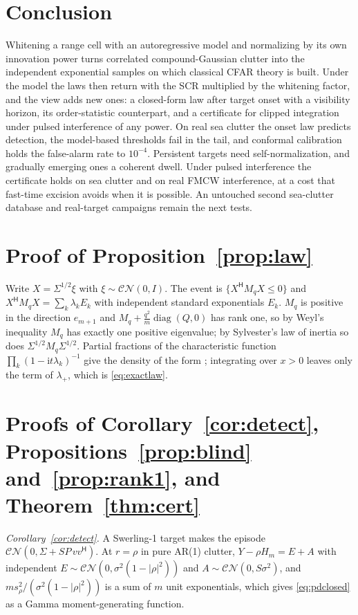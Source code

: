 \documentclass[journal]{IEEEtran}
\begin{document}
\section{Conclusion}
Whitening a range cell with an autoregressive model and normalizing by its own innovation power turns correlated compound-Gaussian clutter into the independent exponential samples on which classical CFAR theory is built. Under the model the laws then return with the SCR multiplied by the whitening factor, and the view adds new ones: a closed-form law after target onset with a visibility horizon, its order-statistic counterpart, and a certificate for clipped integration under pulsed interference of any power. On real sea clutter the onset law predicts detection, the model-based thresholds fail in the tail, and conformal calibration holds the false-alarm rate to $10^{-4}$. Persistent targets need self-normalization, and gradually emerging ones a coherent dwell. Under pulsed interference the certificate holds on sea clutter and on real FMCW interference, at a cost that fast-time excision avoids when it is possible. An untouched second sea-clutter database and real-target campaigns remain the next tests.

\appendices
\section{Proof of Proposition~\ref{prop:law}}\label{app:law}
Write $X=\Sigma^{1/2}\xi$ with $\xi\sim\mathcal{CN}(0,I)$. The event is $\{X^{\mathsf H}M_qX\le0\}$ and $X^{\mathsf H}M_qX=\sum_k\lambda_kE_k$ with independent standard exponentials $E_k$. $M_q$ is positive in the direction $e_{m+1}$ and $M_q+\frac{q^2}{m}\operatorname{diag}(Q,0)$ has rank one, so by Weyl's inequality $M_q$ has exactly one positive eigenvalue; by Sylvester's law of inertia so does $\Sigma^{1/2}M_q\Sigma^{1/2}$. Partial fractions of the characteristic function $\prod_k(1-\mathrm it\lambda_k)^{-1}$ give the density of the form \cite{alnaffouri2016}; integrating over $x>0$ leaves only the term of $\lambda_+$, which is \eqref{eq:exactlaw}.

\section{Proofs of Corollary~\ref{cor:detect}, Propositions~\ref{prop:blind} and~\ref{prop:rank1}, and Theorem~\ref{thm:cert}}\label{app:detect}
\emph{Corollary~\ref{cor:detect}.} A Swerling-1 target makes the episode $\mathcal{CN}(0,\Sigma+SP\,vv^{\mathsf H})$. At $r=\rho$ in pure AR(1) clutter, $Y-\rho H_m=E+A$ with independent $E\sim\mathcal{CN}(0,\sigma^2(1-|\rho|^2))$ and $A\sim\mathcal{CN}(0,S\sigma^2)$, and $ms_\rho^2/(\sigma^2(1-|\rho|^2))$ is a sum of $m$ unit exponentials, which gives \eqref{eq:pdclosed} as a Gamma moment-generating function.
\end{document}
